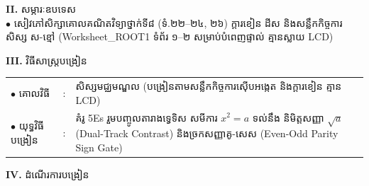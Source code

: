 \documentclass[a4paper,10pt]{article}
\newcommand{\en}[1]{{\TimesEn #1}}
\begin{document}
{%
\textbf{II.} {\muol សម្ភារៈឧបទេស}\\[1pt]
\hspace*{0.55cm}$\bullet$ \hspace{0.35cm} សៀវភៅសិក្សាគោលគណិតវិទ្យាថ្នាក់ទី៨ (ទំ.២២–២៤, ២៦) ក្ដារខៀន ដីស និងសន្លឹកកិច្ចការសិស្ស ស-ខ្មៅ (\en{Worksheet\_ROOT1} ទំព័រ ១–២ សម្រាប់បំពេញផ្ទាល់ គ្មានស្លាយ \en{LCD})

\vspace{2pt}

\textbf{III.} {\muol វិធីសាស្រ្តបង្រៀន}\\[1pt]
\hspace*{0.45cm}%
\begin{tabular}{@{}l l L{14.85cm}@{}}
  $\bullet$ \hspace{0.25cm} គោលវិធី & : & សិស្សមជ្ឈមណ្ឌល (បង្រៀនតាមសន្លឹកកិច្ចការស៊ើបអង្កេត និងក្ដារខៀន គ្មាន \en{LCD}) \\
  $\bullet$ \hspace{0.25cm} យុទ្ធវិធីបង្រៀន & : & គំរូ \en{5Es} រួមបញ្ចូលតារាងទ្វេទិស សមីការ $x^2=a$ ទល់នឹង និមិត្តសញ្ញា $\sqrt{a}$ (\en{Dual-Track Contrast}) និងច្រកសញ្ញាគូ-សេស (\en{Even-Odd Parity Sign Gate}) \\
\end{tabular}
}

\vspace{2pt}

\textbf{IV.} {\muol ដំណើរការបង្រៀន}

\vspace{1pt}
\end{document}
